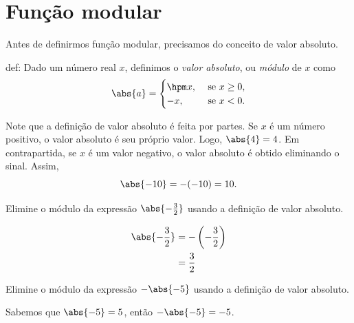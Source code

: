 \section{Função modular}

Antes de definirmos função modular, precisamos do conceito de valor absoluto.

\begin{definicao}{}{def:}
  Dado um número real $x$, definimos o
  \emph{valor absoluto},
  ou \emph{módulo} de $x$ como
  \[
    \abs{a} = \begin{cases}
    \hpm x, & \text{ se } x \geq 0, \\
    -    x, & \text{ se } x <    0.
    \end{cases}
  \]
\end{definicao}

Note que a definição de valor absoluto é feita por partes. Se $x$ é um
número positivo, o valor absoluto é seu próprio valor.
Logo, $\abs{4}=4$.
Em contrapartida, se $x$ é um valor negativo, o valor absoluto é obtido
eliminando o sinal. Assim,
\[
  \abs{-10} = -(-10) = 10.
\]

\begin{example}
  Elimine o módulo da expressão
  \(
    \abs{-\frac{3}{2}}
  \)
  usando a definição de valor absoluto.

  \solution
  \begin{align*}
    \abs{-\frac{3}{2}}
    & = - \left(-\frac{3}{2} \right) \\
    & = \frac{3}{2}
  \end{align*}
\end{example}

\begin{example}
  Elimine o módulo da expressão
  \(
    -\abs{-5}
  \)
  usando a definição de valor absoluto.

  \solution
  Sabemos que $\abs{-5}=5$, então $-\abs{-5} =-5$.
\end{example}

